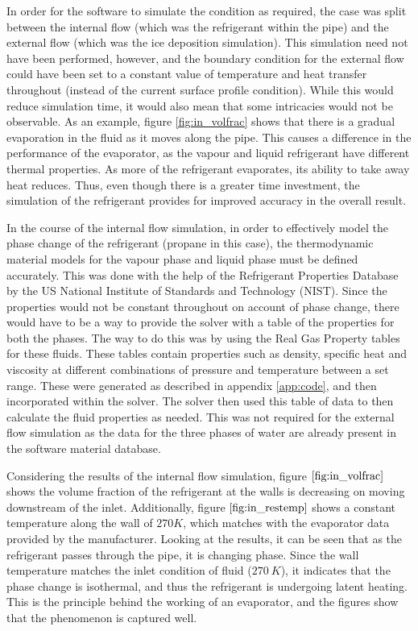 \documentclass[11pt,a4paper,twoside,oneside]{article}
\begin{document}
In order for the software to simulate the condition as required, the case was split between the internal flow (which was the refrigerant within the pipe) and the external flow (which was the ice deposition simulation). This simulation need not have been performed, however, and the boundary condition for the external flow could have been set to a constant value of temperature and heat transfer throughout (instead of the current surface profile condition). While this would reduce simulation time, it would also mean that some intricacies would not be observable. As an example, figure \ref{fig:in_volfrac} shows that there is a gradual evaporation in the fluid as it moves along the pipe. This causes a difference in the performance of the evaporator, as the vapour and liquid refrigerant have different thermal properties. As more of the refrigerant evaporates, its ability to take away heat reduces. Thus, even though there is a greater time investment, the simulation of the refrigerant provides for improved accuracy in the overall result.

In the course of the internal flow simulation, in order to effectively model the phase change of the refrigerant (propane in this case), the thermodynamic material models for the vapour phase and liquid phase must be defined accurately. This was done with the help of the Refrigerant Properties Database by the US National Institute of Standards and Technology (NIST). Since the properties would not be constant throughout on account of phase change, there would have to be a way to provide the solver with a table of the properties for both the phases. The way to do this was by using the Real Gas Property tables for these fluids. These tables contain properties such as density, specific heat and viscosity at different combinations of pressure and temperature between a set range. These were generated as described in appendix \ref{app:code}, and then incorporated within the solver. The solver then used this table of data to then calculate the fluid properties as needed. This was not required for the external flow simulation as the data for the three phases of water are already present in the software material database.

Considering the results of the internal flow simulation, figure $\ref{fig:in_volfrac}$ shows the volume fraction of the refrigerant at the walls is decreasing on moving downstream of the inlet. Additionally, figure $\ref{fig:in_restemp}$ shows a constant temperature along the wall of $270K$, which matches with the evaporator data provided by the manufacturer. Looking at the results, it can be seen that as the refrigerant passes through the pipe, it is changing phase. Since the wall temperature matches the inlet condition of fluid ($270\ K$), it indicates that the phase change is isothermal, and thus the refrigerant is undergoing latent heating. This is the principle behind the working of an evaporator, and the figures show that the phenomenon is captured well.
\end{document}
